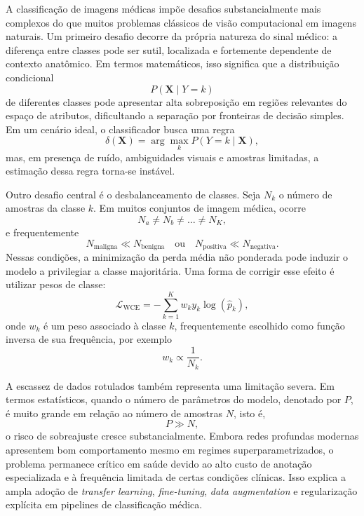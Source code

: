 \documentclass[tcc,capa]{texufpel}
\begin{document}
A classificação de imagens médicas impõe desafios substancialmente mais complexos do que muitos problemas clássicos de visão computacional em imagens naturais. Um primeiro desafio decorre da própria natureza do sinal médico: a diferença entre classes pode ser sutil, localizada e fortemente dependente de contexto anatômico. Em termos matemáticos, isso significa que a distribuição condicional
\begin{equation}
P(\mathbf{X}\mid Y=k)
\end{equation}
de diferentes classes pode apresentar alta sobreposição em regiões relevantes do espaço de atributos, dificultando a separação por fronteiras de decisão simples. Em um cenário ideal, o classificador busca uma regra
\begin{equation}
\delta(\mathbf{X}) = \arg\max_{k} P(Y=k\mid \mathbf{X}),
\end{equation}
mas, em presença de ruído, ambiguidades visuais e amostras limitadas, a estimação dessa regra torna-se instável.

Outro desafio central é o desbalanceamento de classes. Seja $N_k$ o número de amostras da classe $k$. Em muitos conjuntos de imagem médica, ocorre
\begin{equation}
N_a \neq N_b \neq \dots \neq N_K,
\end{equation}
e frequentemente
\begin{equation}
N_{\text{maligna}} \ll N_{\text{benigna}}
\quad \text{ou} \quad
N_{\text{positiva}} \ll N_{\text{negativa}}.
\end{equation}
Nessas condições, a minimização da perda média não ponderada pode induzir o modelo a privilegiar a classe majoritária. Uma forma de corrigir esse efeito é utilizar pesos de classe:
\begin{equation}
\mathcal{L}_{\text{WCE}}
=
-\sum_{k=1}^{K} w_k y_k \log(\hat{p}_k),
\end{equation}
onde $w_k$ é um peso associado à classe $k$, frequentemente escolhido como função inversa de sua frequência, por exemplo
\begin{equation}
w_k \propto \frac{1}{N_k}.
\end{equation}

A escassez de dados rotulados também representa uma limitação severa. Em termos estatísticos, quando o número de parâmetros do modelo, denotado por $P$, é muito grande em relação ao número de amostras $N$, isto é,
\begin{equation}
P \gg N,
\end{equation}
o risco de sobreajuste cresce substancialmente. Embora redes profundas modernas apresentem bom comportamento mesmo em regimes superparametrizados, o problema permanece crítico em saúde devido ao alto custo de anotação especializada e à frequência limitada de certas condições clínicas. Isso explica a ampla adoção de \textit{transfer learning}, \textit{fine-tuning}, \textit{data augmentation} e regularização explícita em pipelines de classificação médica.
\end{document}
